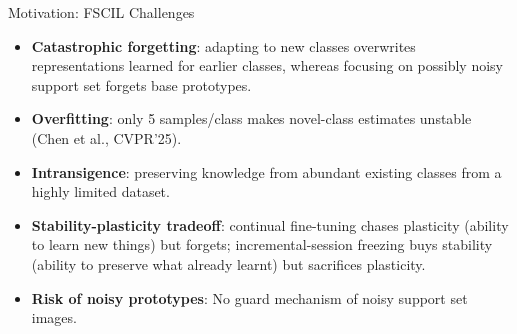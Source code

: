 \documentclass[aspectratio=169,10pt]{beamer}
\begin{document}
\begin{frame}{Motivation: FSCIL Challenges}
    \vfill
    \begin{itemize}
        \setlength{\itemsep}{1em}
        \item \textbf{Catastrophic forgetting}: adapting to new classes overwrites representations learned for earlier classes, whereas focusing on possibly noisy support set forgets base prototypes.
        \item \textbf{Overfitting}: only 5 samples/class makes novel-class estimates unstable (Chen et al., CVPR'25).
        \item \textbf{Intransigence}:  preserving knowledge from abundant existing classes from a highly limited
dataset.
        \item \textbf{Stability-plasticity tradeoff}: continual fine-tuning chases plasticity (ability to learn new things) but forgets; incremental-session freezing buys stability (ability to preserve what already learnt) but sacrifices plasticity.
        \item \textbf{Risk of noisy prototypes}: No guard mechanism of noisy support set images.
    \end{itemize}
    \vfill
\end{frame}




\end{document}
